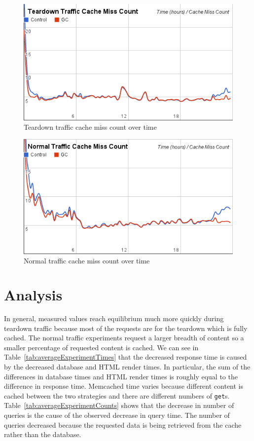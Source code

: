 \documentclass[12pt]{ucthesis}
\begin{document}
\begin{figure}[htp]
\centering
\includegraphics[width=\textwidth]{assets/teardownMissCountXTime.png}
\caption{Teardown traffic cache miss count over time}
\label{fig:teardownMissCountXTime}
\end{figure}
\begin{figure}[htp]
\centering
\includegraphics[width=\textwidth]{assets/normalMissCountXTime.png}
\caption{Normal traffic cache miss count over time}
\label{fig:normalMissCountXTime}
\end{figure}

\section{Analysis}
In general, measured values reach equilibrium much more quickly during teardown traffic because most of the requests are for the teardown which is fully cached.
The normal traffic experiments request a larger breadth of content so a smaller percentage of requested content is cached.
We can see in Table~\ref{tab:averageExperimentTimes} that the decreased response time is caused by the decreased database and HTML render times.
In particular, the sum of the differences in database times and HTML render times is roughly equal to the difference in response time.
\textsf{Memcached} time varies because different content is cached between the two strategies and there are different numbers of {\tt get}s.
Table~\ref{tab:averageExperimentCounts} shows that the decrease in number of queries is the cause of the observed decrease in query time.
The number of queries decreased because the requested data is being retrieved from the cache rather than the database.
\end{document}
